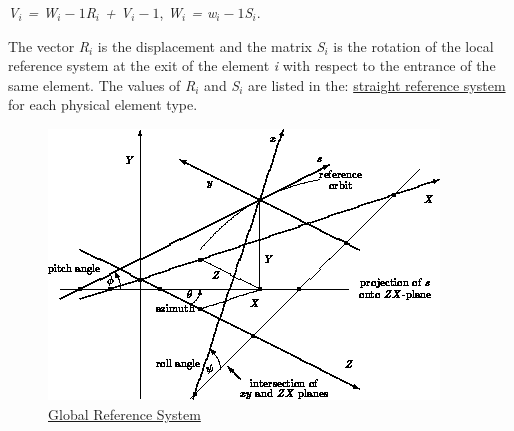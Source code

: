 \textit{V$_i$ = W$_i-1$R$_i$ + V$_i-1$}, \textit{W$_i$ = w$_i-1$S$_i$}. 

The vector \textit{R$_i$} is the displacement and the matrix
\textit{S$_i$} is the rotation of the local reference system  at the
exit of the element \textit{i} with respect to the entrance  of the same
element. The values of \textit{R$_i$} and \textit{S$_i$} are listed in
the:   \href{local_system.html#straight}{straight reference system} for
each physical element type.  

\begin{figure}[h!]
  \centering
	\includegraphics{figures/global.png}
  \caption{\href{global}{Global Reference System }}%
\end{figure}



